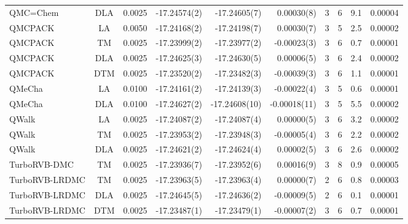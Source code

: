 \begin{tabular}{|lc|lr|r|r|cccc|}
QMC=Chem         &  DLA  & 0.0025 & -17.24574(2) & -17.24605(7) & 0.00030(8) & 3 & 6 & 9.1 & 0.00004 \\
QMCPACK          &  LA   & 0.0050 & -17.24168(2) & -17.24198(7) & 0.00030(7) & 3 & 5 & 2.5 & 0.00002 \\
QMCPACK          &  TM   & 0.0025 & -17.23999(2) & -17.23977(2) & -0.00023(3) & 3 & 6 & 0.7 & 0.00001 \\
QMCPACK          &  DLA  & 0.0025 & -17.24625(3) & -17.24630(5) & 0.00006(5) & 3 & 6 & 2.4 & 0.00002 \\
QMCPACK          &  DTM  & 0.0025 & -17.23520(2) & -17.23482(3) & -0.00039(3) & 3 & 6 & 1.1 & 0.00001 \\
QMeCha           &  LA   & 0.0100 & -17.24161(2) & -17.24139(3) & -0.00022(4) & 3 & 5 & 0.6 & 0.00001 \\
QMeCha           &  DLA  & 0.0100 & -17.24627(2) & -17.24608(10) & -0.00018(11) & 3 & 5 & 5.5 & 0.00002 \\
QWalk            &  LA   & 0.0025 & -17.24087(2) & -17.24087(4) & 0.00000(5) & 3 & 6 & 3.2 & 0.00002 \\
QWalk            &  TM   & 0.0025 & -17.23953(2) & -17.23948(3) & -0.00005(4) & 3 & 6 & 2.2 & 0.00002 \\
QWalk            &  DLA  & 0.0025 & -17.24621(2) & -17.24624(4) & 0.00002(5) & 3 & 6 & 2.6 & 0.00002 \\
TurboRVB-DMC     &  TM   & 0.0025 & -17.23936(7) & -17.23952(6) & 0.00016(9) & 3 & 8 & 0.9 & 0.00005 \\
TurboRVB-LRDMC   &  TM   & 0.0025 & -17.23963(5) & -17.23963(4) & 0.00000(7) & 2 & 6 & 0.8 & 0.00003 \\
TurboRVB-LRDMC   &  DLA  & 0.0025 & -17.24645(5) & -17.24636(2) & -0.00009(5) & 2 & 6 & 0.1 & 0.00001 \\
TurboRVB-LRDMC   &  DTM  & 0.0025 & -17.23487(1) & -17.23479(1) & -0.00007(2) & 3 & 6 & 0.7 & 0.00001 \\
\bottomrule
\end{tabular}

